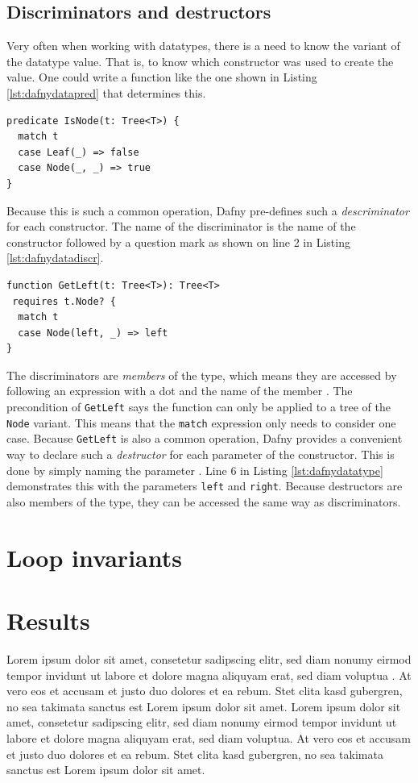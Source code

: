\documentclass[a4paper]{article}
\begin{document}
\subsection{Discriminators and destructors}
Very often when working with datatypes, there is a need to know the variant of the datatype value. That is, to know
which constructor was used to create the value. One could write a function like the one shown in Listing \ref{lst:dafnydatapred}
that determines this.
\begin{lstlisting}[style=dafnystyle, caption={A predicate checking if the argument t is a Node.}, label={lst:dafnydatapred}]
predicate IsNode(t: Tree<T>) {
  match t
  case Leaf(_) => false
  case Node(_, _) => true
}
\end{lstlisting}
Because this is such a common operation, Dafny pre-defines such a \textit{descriminator} for each constructor.
The name of the discriminator is the name of the constructor followed by a question mark as shown on line 2
in Listing \ref{lst:dafnydatadiscr}.
\begin{lstlisting}[style=dafnystyle, caption={A predicate checking if the argument t is a Node.}, label={lst:dafnydatadiscr}]
function GetLeft(t: Tree<T>): Tree<T>
 requires t.Node? {
  match t
  case Node(left, _) => left
}
\end{lstlisting}
The discriminators are \textit{members} of the type, which means they are accessed by following an expression with a dot
and the name of the member \cite{leino2023program}. The precondition of \texttt{GetLeft} says the function can only be
applied to a tree of the \texttt{Node} variant. This means that the \texttt{match} expression only needs to consider
one case. Because \texttt{GetLeft} is also a common operation, Dafny provides a convenient way to declare such a
\textit{destructor} for each parameter of the constructor. This is done by simply naming the parameter \cite{leino2023program}.
Line 6 in Listing \ref{lst:dafnydatatype} demonstrates this with the parameters \texttt{left} and \texttt{right}.
Because destructors are also members of the type, they can be accessed the same way as discriminators.

\section{Loop invariants}


\section{Results} %
\label{sec:results}
Lorem ipsum dolor sit amet, consetetur sadipscing elitr, sed diam nonumy eirmod tempor invidunt ut labore et dolore magna aliquyam erat, sed diam voluptua \citep[p. 48]{Baddeley:1974ts}. At vero eos et accusam et justo duo dolores et ea rebum. Stet clita kasd gubergren, no sea takimata sanctus est Lorem ipsum dolor sit amet. Lorem ipsum dolor sit amet, consetetur sadipscing elitr, sed diam nonumy eirmod tempor invidunt ut labore et dolore magna aliquyam erat, sed diam voluptua. At vero eos et accusam et justo duo dolores et ea rebum. Stet clita kasd gubergren, no sea takimata sanctus est Lorem ipsum dolor sit amet.
\end{document}
